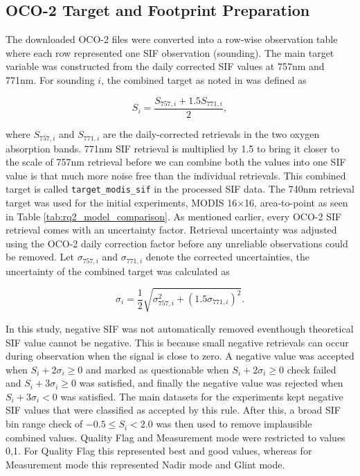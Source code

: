 \subsection{OCO-2 Target and Footprint Preparation}

The downloaded OCO-2 files were converted into a row-wise observation table where each row represented one SIF observation (sounding). The main target variable was constructed from the daily corrected SIF values at 757nm and 771nm. For sounding $i$, the combined target as noted in \cite{yu2019high} was defined as 

\begin{equation}
    S_i = \frac{S_{757,i}+1.5S_{771,i}}{2},
    \label{eq:combined_sif_target}
\end{equation}

where $S_{757,i}$ and $S_{771,i}$ are the daily-corrected retrievals in the two oxygen absorption bands. 771nm SIF retrieval is multiplied by 1.5 to bring it closer to the scale of 757nm retrieval before we can combine both the values into one SIF value is that much more noise free than the individual retrievals. This combined target is called \texttt{target\_modis\_sif} in the processed SIF data. The 740nm retrieval target was used for the initial experiments, MODIS 16$\times$16, area-to-point as seen in Table \ref{tab:rq2_model_comparison}. As mentioned earlier, every OCO-2 SIF retrieval comes with an uncertainty factor. Retrieval uncertainty was adjusted using the OCO-2 daily correction factor before any unreliable observations could be removed. Let $\sigma_{757,i}$ and $\sigma_{771,i}$ denote the corrected uncertainties, the uncertainty of the combined target was calculated as

\begin{equation}
    \sigma_i = \frac{1}{2}
    \sqrt{\sigma_{757,i}^{2}+\left(1.5\sigma_{771,i}\right)^{2}}.
    \label{eq:combined_sif_uncertainty}
\end{equation}

In this study, negative SIF was not automatically removed eventhough theoretical SIF value cannot be negative. This is because small negative retrievals can occur during observation when the signal is close to zero. A negative value was accepted when $S_i+2\sigma_i\geq0$ and marked as questionable when $S_i+2\sigma_i\geq0$ check failed and  $S_i+3\sigma_i\geq0$ was satisfied, and finally the negative value was rejected when $S_i+3\sigma_i<0$ was satisfied. The main datasets for the experiments kept negative SIF values that were classified as accepted by this rule. After this, a broad SIF bin range check of $-0.5\leq S_i<2.0$ was then used to remove implausible combined values. Quality Flag and Measurement mode were restricted to values 0,1. For Quality Flag this represented best and good values, whereas for Measurement mode this represented Nadir mode and Glint mode. 

